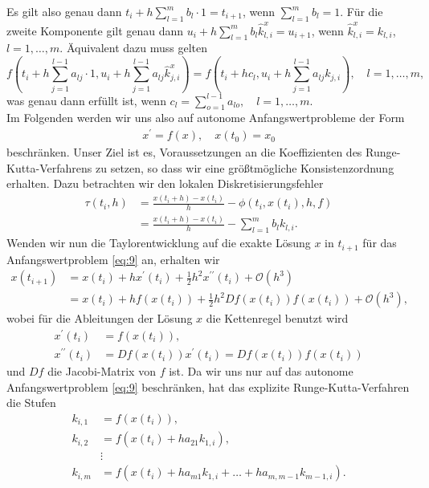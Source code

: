 Es gilt also genau dann $t_i + h \sum\limits_{l=1}^{m} b_l \cdot 1 = t_{i+1}$, wenn $\sum\limits_{l=1}^{m} b_l = 1$.
Für die zweite Komponente gilt genau dann $u_i + h \sum\limits_{l=1}^{m} b_l \hat{k}^{x}_{l,i} = u_{i+1}$,
wenn $\hat{k}^{x}_{l,i} = k_{l,i}$, $l = 1, \dots, m$. Äquivalent dazu muss gelten
\[
    f\left( t_i + h \sum\limits_{j=1}^{l-1} a_{lj} \cdot 1,
    u_i + h \sum\limits_{j=1}^{l-1} a_{lj} \hat{k}^{x}_{j,i} \right)
    = f\left( t_i +hc_l, u_i + h \sum_{j=1}^{l-1} a_{lj} k_{j,i} \right), \quad l = 1, \dots, m,
\]
was genau dann erfüllt ist, wenn $c_l = \sum\limits_{o=1}^{l-1} a_{lo}, \quad l= 1, \dots, m.$ \qedwhite\\
Im Folgenden werden wir uns also auf autonome Anfangswertprobleme der Form
\begin{align}
    x^{\prime} = f(x), \quad x(t_0) = x_0   \label{eq:9}
\end{align}
beschränken. Unser Ziel ist es, Voraussetzungen an die Koeffizienten des Runge-Kutta-Verfahrens zu setzen, so dass wir eine
größtmögliche Konsistenzordnung erhalten. Dazu betrachten wir den lokalen Diskretisierungsfehler
\begin{align}
    \tau (t_i,h) &= \frac{x(t_i + h) - x(t_i)}{h} - \phi(t_i, x(t_i), h, f) \nonumber \\
    &= \frac{x(t_i + h) - x(t_i)}{h} - \sum_{l=1}^{m} b_l k_{l,i}.  \label{eq:kon_auto}
\end{align}
Wenden wir nun die Taylorentwicklung auf die exakte Lösung $x$ in $t_{i+1}$ für das Anfangswertproblem \eqref{eq:9} an,
erhalten wir
\begin{align*}
    x(t_{i+1}) &= x(t_i) + hx^{\prime}(t_i) + \frac{1}{2} h^2 x^{\prime \prime}(t_i) + \mathcal{O}(h^3) \\
    &= x(t_i) + hf(x(t_i)) + \frac{1}{2} h^2 Df(x(t_i)) f(x(t_i)) + \mathcal{O}(h^3),
\end{align*}
wobei für die Ableitungen der Lösung $x$ die Kettenregel benutzt wird
\begin{align*}
    x^{\prime}(t_i) &= f(x(t_i)),\\
    x^{\prime \prime}(t_i) &= Df(x(t_i))x^{\prime}(t_i) = Df(x(t_i))f(x(t_i))
\end{align*}
und $Df$ die Jacobi-Matrix von $f$ ist. Da wir uns nur auf das autonome Anfangswertproblem
\eqref{eq:9} beschränken, hat das explizite Runge-Kutta-Verfahren die Stufen
\begin{align*}
    k_{i,1} &= f(x(t_i)), \\
    k_{i,2} &= f(x(t_i) + ha_{21}k_{1,i}), \\
    &\vdots\\
    k_{i,m} &= f(x(t_i) + ha_{m1}k_{1,i} + \dots + ha_{m,m-1}k_{m-1,i}).
\end{align*}

